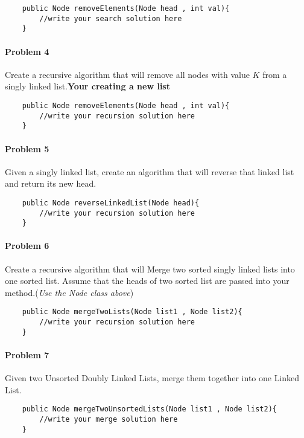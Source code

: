 \documentclass[letterpaper]{article}
\begin{document}
\begin{verbatim}
    public Node removeElements(Node head , int val){
        //write your search solution here
    }
\end{verbatim} 

\paragraph{Problem 4} Create a recursive algorithm that will remove all nodes with value $K$ from a singly linked list.\textbf{Your creating a new list}

\begin{verbatim}
    public Node removeElements(Node head , int val){
        //write your recursion solution here
    }
\end{verbatim}

\paragraph{Problem 5} Given a singly linked list, create an algorithm that will reverse that linked list and return its new head.

\begin{verbatim}
    public Node reverseLinkedList(Node head){
        //write your recursion solution here
    }
\end{verbatim}

\paragraph{Problem 6} Create a recursive algorithm that will Merge two sorted singly linked lists into one sorted list. Assume that the heads of two sorted list are passed into your method.(\textit{Use the Node class above})

\begin{verbatim}
    public Node mergeTwoLists(Node list1 , Node list2){
        //write your recursion solution here
    }
\end{verbatim}

\paragraph{Problem 7} Given two Unsorted Doubly Linked Lists, merge them together into one Linked List.

\begin{verbatim}
    public Node mergeTwoUnsortedLists(Node list1 , Node list2){
        //write your merge solution here
    }
\end{verbatim}
\end{document}
